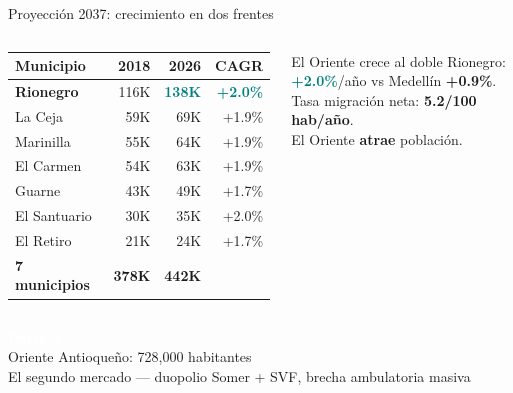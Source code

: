 \documentclass[aspectratio=169, 11pt]{beamer}
\newcommand{\highlight}[1]{\textcolor{teal}{\textbf{#1}}}
\newcommand{\src}[1]{\par\vspace{2pt}{\tiny\textcolor{slate}{Fuente: #1}}}
\begin{document}
\begin{frame}{Proyección 2037: crecimiento en dos frentes}
\begin{columns}[T]
\vspace{3pt}
{\scriptsize
\begin{tabular}{@{}lrrr@{}}
\toprule
\textbf{Municipio} & \textbf{2018} & \textbf{2026} & \textbf{CAGR} \\
\midrule
\rowcolor{teal!8}
\textbf{Rionegro} & 116K & \highlight{138K} & \highlight{+2.0\%} \\
La Ceja & 59K & 69K & +1.9\% \\
Marinilla & 55K & 64K & +1.9\% \\
El Carmen & 54K & 63K & +1.9\% \\
Guarne & 43K & 49K & +1.7\% \\
El Santuario & 30K & 35K & +2.0\% \\
El Retiro & 21K & 24K & +1.7\% \\
\midrule
\rowcolor{teal!6}
\textbf{7 municipios} & \textbf{378K} & \textbf{442K} & \\
\bottomrule
\end{tabular}
}

\vspace{4pt}
\begin{exampleblock}{\small El Oriente crece al doble}
\scriptsize
Rionegro: \highlight{+2.0\%}/año vs Medellín \textbf{+0.9\%}.\\
Tasa migración neta: \textbf{5.2/100 hab/año}.\\
El Oriente \textbf{atrae} población.
\end{exampleblock}
\src{DANE CNPV 2018, DNP Proyecciones, DENSURBAM}
\end{columns}
\end{frame}

{
\begin{frame}[plain]
\vfill
\begin{center}
{\Huge\bfseries\textcolor{white}{Parte 3}}\\[8pt]
{\Large\textcolor{white!85}{Oriente Antioqueño: 728,000 habitantes}}\\[12pt]
{\normalsize\textcolor{white!60}{El segundo mercado --- duopolio Somer + SVF, brecha ambulatoria masiva}}
\end{center}
\vfill
\end{frame}
}
\end{document}
